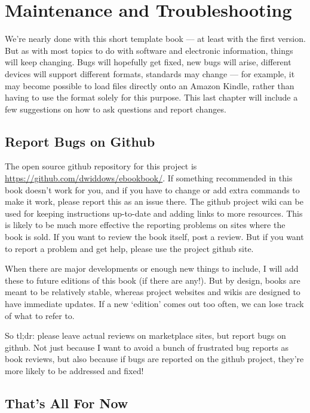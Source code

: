 \chapter{Maintenance and Troubleshooting}

We're nearly done with this short template book --- at least with the first version.
But as with most topics to do with software and electronic information, things will keep changing.
Bugs will hopefully get fixed, new bugs will arise, different devices will support different formats,
standards may change --- for example, it may become
possible to load  files directly onto an Amazon Kindle, rather than having to use the
 format solely for this purpose. This last chapter will include a few suggestions on how
to ask questions and report changes.

\section{Report Bugs on Github}

The open source github repository for this project is {\small \url{https://github.com/dwiddows/ebookbook/}}.
If something recommended in this book doesn't work for you, and if you have to change or add extra
commands to make it work, please report this as an issue there. The github project wiki can be used for
keeping instructions up-to-date and adding links to more resources. This is likely to be much more effective
the reporting problems on sites where the book is sold.
If you want to review the book itself, post a review. But if you want to report a problem and get
help, please use the project github site.

When there are major developments or enough new things to include, I will add these to future
editions of this book (if there are any!). But by design, books are meant to be relatively stable, whereas
project websites and wikis are designed to have immediate updates. If a new `edition' comes out too often,
we can lose track of what to refer to.

So tl;dr: please leave actual reviews on marketplace sites, but report bugs on github. Not just because
I want to avoid a bunch of frustrated bug reports as book reviews, but also because if
bugs are reported on the github project, they're more likely to be addressed and fixed!

\section{That's All For Now}

